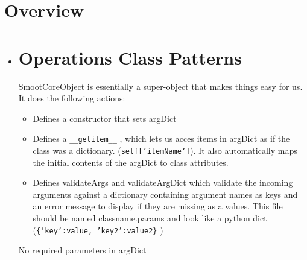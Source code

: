 \documentclass{article}
\begin{document}
    \section{Overview}
        \begin{itemize}
            \item
    \section{Operations Class Patterns}
    {SmootCoreObject is essentially a super-object
            that makes things easy for us.  It does the following actions:
                \begin{itemize}
                    \item Defines a constructor that sets argDict
                    \item Defines a \texttt{\_\_getitem\_\_} , which lets us acces items in
                    argDict as if the class was a dictionary.
                    (\texttt{self['itemName']}).  It also automatically maps the
                    initial contents of the argDict to class attributes.
                    \item Defines validateArgs and validateArgDict which
                    validate the incoming arguments against a dictionary
                    containing argument names as keys and an error message to
                    display if they are missing as a values.  This file should
                    be named classname.params and look like a python dict
                    (\texttt{\{'key':value, 'key2':value2\}} )
                \end{itemize}
                }
            {No required parameters in argDict}
\end{itemize}
\end{document}
